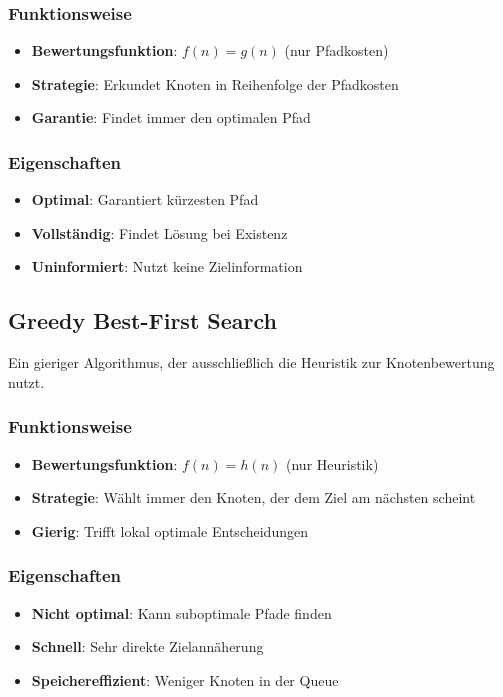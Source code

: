 \documentclass[12pt,a4paper]{article}
\begin{document}
\subsubsection{Funktionsweise}
\begin{itemize}
    \item \textbf{Bewertungsfunktion}: $f(n) = g(n)$ (nur Pfadkosten)
    \item \textbf{Strategie}: Erkundet Knoten in Reihenfolge der Pfadkosten
    \item \textbf{Garantie}: Findet immer den optimalen Pfad
\end{itemize}

\subsubsection{Eigenschaften}
\begin{itemize}
    \item \textbf{Optimal}: Garantiert kürzesten Pfad
    \item \textbf{Vollständig}: Findet Lösung bei Existenz
    \item \textbf{Uninformiert}: Nutzt keine Zielinformation
\end{itemize}

\subsection{Greedy Best-First Search}

Ein gieriger Algorithmus, der ausschließlich die Heuristik zur Knotenbewertung nutzt.

\subsubsection{Funktionsweise}
\begin{itemize}
    \item \textbf{Bewertungsfunktion}: $f(n) = h(n)$ (nur Heuristik)
    \item \textbf{Strategie}: Wählt immer den Knoten, der dem Ziel am nächsten scheint
    \item \textbf{Gierig}: Trifft lokal optimale Entscheidungen
\end{itemize}

\subsubsection{Eigenschaften}
\begin{itemize}
    \item \textbf{Nicht optimal}: Kann suboptimale Pfade finden
    \item \textbf{Schnell}: Sehr direkte Zielannäherung
    \item \textbf{Speichereffizient}: Weniger Knoten in der Queue
\end{itemize}
\end{document}
